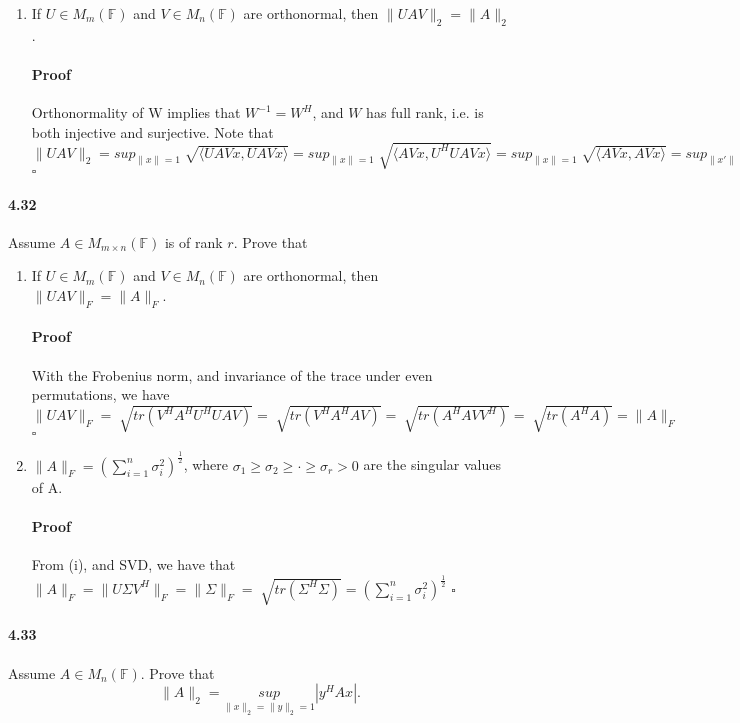\documentclass[letterpaper,12pt]{article}
\theoremstyle{definition}
\begin{document}
\begin{enumerate}[label=(\roman*)]
\item If $U \in M_m(\mathbb{F})$ and $V \in M_n(\mathbb{F})$ are orthonormal, then $\|UAV\|_2 = \|A\|_2$.

\paragraph{Proof} Orthonormality of W implies that $W^{-1} = W^H$, and $W$ has full rank, i.e. is both injective and surjective. Note that 
$\|UAV\|_2 = sup_{\|x\| = 1}\sqrt[]{\langle UAVx, UAVx \rangle}
= sup_{\|x\| = 1}\sqrt[]{\langle AVx, U^HUAVx \rangle} 
= sup_{\|x\| = 1} \sqrt[]{\langle AVx, AVx \rangle}
= sup_{\|x'\| = 1} \sqrt[]{\langle Ax', Ax' \rangle}
=\|A\|_2$
$\square$

\end{enumerate}


\paragraph{4.32} Assume $A \in M_{m \times n}(\mathbb{F})$ is of rank $r$. Prove that
\begin{enumerate}[label=(\roman*)]
\item If $U \in M_m(\mathbb{F})$ and $V \in M_n(\mathbb{F})$ are orthonormal, then $\|UAV\|_F = \|A\|_F$.

\paragraph{Proof} With the Frobenius norm, and invariance of the trace under even permutations, we have 
$\|UAV\|_F 
= \sqrt[]{tr(V^HA^HU^HUAV)}
= \sqrt[]{tr(V^HA^HAV)}
= \sqrt[]{tr(A^HAVV^H)}
= \sqrt[]{tr(A^HA)}
= \|A\|_F $
$\square$

\item $\| A\|_F = (\sum_{i = 1}^n \sigma_i^2)^\frac{1}{2}$, where $\sigma_1 \ge \sigma_2 \ge \cdot \ge \sigma_r > 0$ are the singular values of A.

\paragraph{Proof} From (i), and SVD, we have that $\|A\|_F = \|U \Sigma V^H\|_F 
= \|\Sigma \|_F = \sqrt[]{tr(\Sigma^H \Sigma)} = (\sum_{i = 1}^n \sigma_i^2)^\frac{1}{2}$
$\square$
\end{enumerate}


\paragraph{4.33} Assume $A \in M_{n}(\mathbb{F})$. Prove that
$$ \|A\|_2 = \underset{\|x\|_2 = \|y\|_2 = 1}{sup}|y^HAx|.$$
\end{document}
